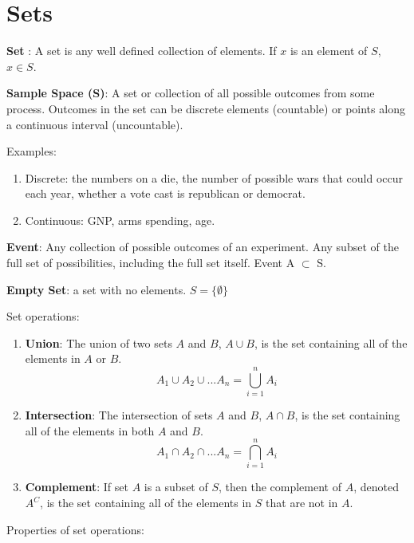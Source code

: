 \documentclass[]{book}
\providecommand{\tightlist}{%
  \setlength{\itemsep}{0pt}\setlength{\parskip}{0pt}}
\theoremstyle{definition}
\theoremstyle{definition}
\theoremstyle{definition}
\theoremstyle{remark}
\begin{document}
\section{Sets}\label{sets-1}

\textbf{Set} : A set is any well defined collection of elements. If
\(x\) is an element of \(S\), \(x \in S\).

\textbf{Sample Space (S)}: A set or collection of all possible outcomes
from some process. Outcomes in the set can be discrete elements
(countable) or points along a continuous interval (uncountable).

Examples:

\begin{enumerate}
\def\labelenumi{\arabic{enumi}.}
\tightlist
\item
  Discrete: the numbers on a die, the number of possible wars that could
  occur each year, whether a vote cast is republican or democrat.
\item
  Continuous: GNP, arms spending, age.
\end{enumerate}

\textbf{Event}: Any collection of possible outcomes of an experiment.
Any subset of the full set of possibilities, including the full set
itself. Event A \(\subset\) S.

\textbf{Empty Set}: a set with no elements. \(S = \{\emptyset\}\)

Set operations:

\begin{enumerate}
\def\labelenumi{\arabic{enumi}.}
\tightlist
\item
  \textbf{Union}: The union of two sets \(A\) and \(B\), \(A \cup B\),
  is the set containing all of the elements in \(A\) or \(B\).
  \[A_1 \cup A_2  \cup... A_n = \bigcup_{i=1}^n A_i\]
\item
  \textbf{Intersection}: The intersection of sets \(A\) and \(B\),
  \(A \cap B\), is the set containing all of the elements in both \(A\)
  and \(B\). \[A_1 \cap A_2  \cap... A_n = \bigcap_{i=1}^n A_i\]
\item
  \textbf{Complement}: If set \(A\) is a subset of \(S\), then the
  complement of \(A\), denoted \(A^C\), is the set containing all of the
  elements in \(S\) that are not in \(A\).
\end{enumerate}

Properties of set operations:
\end{document}
